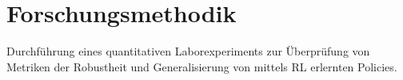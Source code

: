 \section{Forschungsmethodik}

Durchführung eines quantitativen Laborexperiments zur Überprüfung von Metriken der Robustheit und Generalisierung von mittels RL erlernten Policies. 